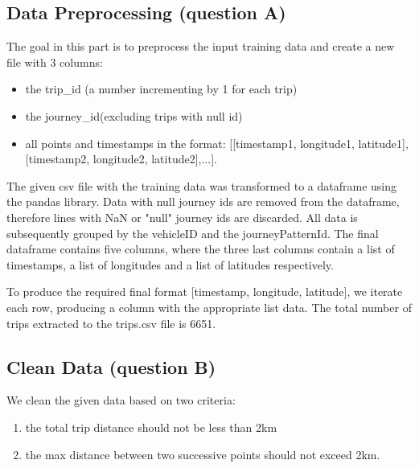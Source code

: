 \documentclass[12pt]{article}
\begin{document}
	\subsection{Data Preprocessing (question A)}
	The goal in this part is to preprocess the input training data and create a
  new file with 3 columns:
  \begin{itemize}
  \item  the trip\_id (a number incrementing by 1 for each trip)
  \item the journey\_id(excluding trips with null id)
  \item all points and timestamps in the format: [[timestamp1, longitude1,
    latitude1], [timestamp2, longitude2, latitude2],...].
  \end{itemize}
  The given csv file with the training data was transformed to a dataframe using
  the pandas library. Data with null journey ids are removed from the dataframe,
  therefore lines with NaN or "null" journey ids are discarded. All data is
  subsequently grouped by the vehicleID and the journeyPatternId. The final dataframe contains five columns, where the three last columns contain a list of timestamps, a list of longitudes and a list of latitudes respectively.
	
	To produce the required final format [timestamp, longitude, latitude], we
  iterate each row, producing a column with the appropriate list data. The total number of trips extracted to the trips.csv file is 6651.
	
	\subsection{Clean Data (question B)}
	We clean the given data based on two criteria:
  \begin{enumerate}
  \item the total trip distance should not be less than 2km
  \item the max distance between two successive points should not exceed 2km.
    \end{enumerate}
	
\end{document}
